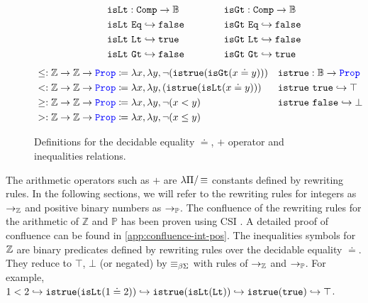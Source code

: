 \begin{figure}
\[\begin{array}{l@{\hspace{4em}}l@{\hspace{4em}}l}
&
\begin{aligned}
  &\tt{isLt} : \tt{Comp} \ra \bb{B} \\
  &\tt{isLt}~\tt{Eq} \re \tt{false} \\
  &\tt{isLt}~\tt{Lt} \re \tt{true} \\
  &\tt{isLt}~\tt{Gt} \re \tt{false} \\
\end{aligned}
&
\begin{aligned}
  &\tt{isGt} : \tt{Comp} \ra \bb{B} \\
  &\tt{isGt}~\tt{Eq} \re \tt{false} \\
  &\tt{isGt}~\tt{Lt} \re \tt{false} \\
  &\tt{isGt}~\tt{Gt} \re \tt{true} \\
\end{aligned}
\end{array}
\]
\noindent
\begin{align*}
&\leq: \bb{Z} \ra \bb{Z} \ra \prop  \coloneq \lambda x,\lambda y, \neg (\tt{istrue}(\tt{isGt}(x \doteq y))) & &\tt{istrue} : \bb{B} \ra \prop \\
&<: \bb{Z} \ra \bb{Z} \ra \prop  \coloneq \lambda x,\lambda y, (\tt{istrue}(\tt{isLt}(x \doteq y))) & &\tt{istrue}~\tt{true} \re \top \\
&\geq: \bb{Z} \ra \bb{Z} \ra \prop  \coloneq \lambda x,\lambda y, \neg (x < y) & &\tt{istrue}~\tt{false} \re \bot \\
&>: \bb{Z} \ra \bb{Z} \ra \prop  \coloneq \lambda x,\lambda y, \neg (x \leq y) & & \\
\end{align*}
\caption{Definitions for the decidable equality $\doteq$, $+$ operator and inequalities relations.}
\label{fig:arith-ops}
\end{figure}

The arithmetic operators such as $+$ are $\lpm$ constants defined by rewriting rules. In the following sections, we will refer to the rewriting rules for integers as $\ra_\bb{Z}$ and positive binary numbers as $\ra_\bb{P}$.
The confluence of the rewriting rules for the arithmetic of $\mathbb{Z}$ and $\mathbb{P}$ has been proven using CSI \cite{CSI}. A detailed proof of confluence can be found in \cref{app:confluence-int-pos}.
The inequalities symbols for $\bb{Z}$ are binary predicates defined by rewriting rules over the decidable equality $\doteq$. They reduce to $\top$, $\bot$ (or negated) by $\equivL$ with rules of $\ra_\bb{Z}$ and $\ra_\bb{P}$.
For example, $1 < 2 \hookrightarrow \tt{istrue}(\tt{isLt}(1 \doteq 2)) \hookrightarrow \tt{istrue}(\tt{isLt}(\tt{Lt})) \hookrightarrow \tt{istrue}(\tt{true}) \hookrightarrow \top$.

